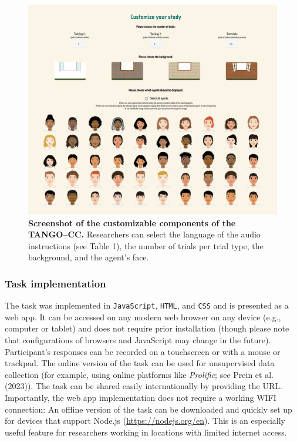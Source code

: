\documentclass[
  man,floatsintext]{apa7}
\begin{document}
\begin{figure}

{\centering \includegraphics[width=1\linewidth]{../figures/tango-cc-screenshot} 

}

\caption{\textbf{Screenshot of the customizable components of the TANGO--CC.} Researchers can select the language of the audio instructions (see Table 1), the number of trials per trial type, the background, and the agent's face.}\label{fig:fig2}
\end{figure}

\subsubsection{Task implementation}\label{task-implementation}

The task was implemented in \texttt{JavaScript}, \texttt{HTML}, and \texttt{CSS} and is presented as a web app.
It can be accessed on any modern web browser on any device (e.g., computer or tablet) and does not require prior installation (though please note that configurations of browsers and JavaScript may change in the future).
Participant's responses can be recorded on a touchscreen or with a mouse or trackpad.
The online version of the task can be used for unsupervised data collection (for example, using online platforms like \emph{Prolific}; see Prein et al. (2023)). The task can be shared easily internationally by providing the URL.
Importantly, the web app implementation does not require a working WIFI connection: An offline version of the task can be downloaded and quickly set up for devices that support Node.js (\url{https://nodejs.org/en}).
This is an especially useful feature for researchers working in locations with limited internet access.
\end{document}
